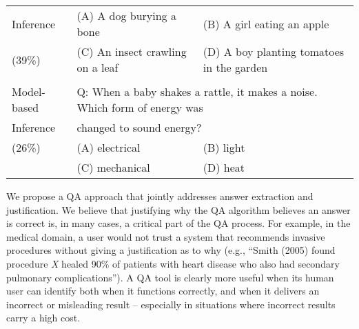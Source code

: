 \begin{table*}[t]
\begin{center}
\begin{tabularx}{\textwidth}{p{2cm}p{5cm}p{5.9cm}}
Inference	&   (A) A dog burying a bone			&   (B) A girl eating an apple	\\
(39\%)		&	(C) An insect crawling on a leaf	&  (D) A boy planting tomatoes in the garden  \\
\\
Model-based & 	\multicolumn{2}{l}{Q: When a baby shakes a rattle, it makes a noise. Which form of energy was} \\
Inference	& 	\multicolumn{2}{l}{changed to sound energy?} \\
(26\%)		&	(A) electrical	&   (B) light   \\
			&	(C) mechanical	&   (D) heat  \\
			
\end{tabularx}


\label{tab:inferenceexamples}
\vspace{-5mm}
\end{center}
\end{table*}





We propose a QA approach that jointly addresses answer extraction and justification.
We believe that justifying why the QA algorithm believes an answer is correct is, in many cases, a critical part of the QA process.
For example, in the medical domain, a user would not trust a system that recommends invasive procedures without giving a justification as to why (e.g., ``Smith (2005) found procedure \emph{X} healed 90\% of patients with heart disease who also had secondary pulmonary complications'').  A QA tool is clearly more useful when its human user can identify both when it functions correctly, and when it delivers an incorrect or misleading result -- especially in situations where incorrect results carry a high cost.  


